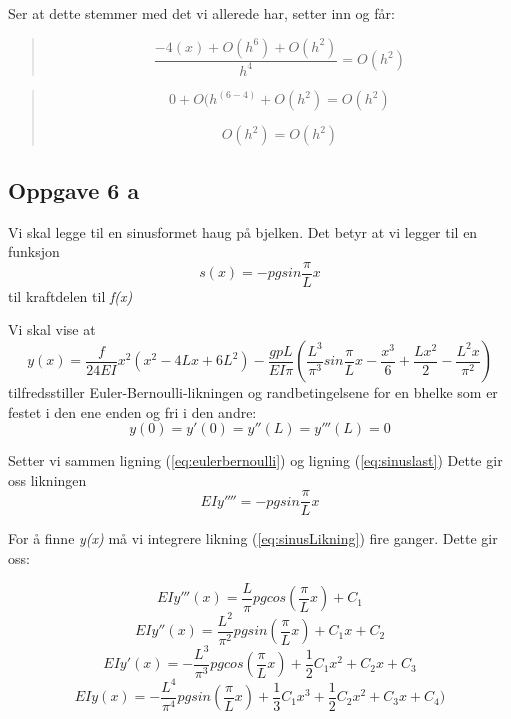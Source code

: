 Ser at dette stemmer med det vi allerede har, setter inn og får:

\begin{quote}
\begin{equation}
\frac{-4(x)+O(h^6)+O(h^2)}{h^4}=O(h^2)
\end{equation}
\end{quote}

\begin{quote}
\begin{equation}
0+O(h^{(6-4)}+O(h^2)=O(h^2)
\end{equation}

\begin{equation}
O(h^2)=O(h^2)
\end{equation}
\end{quote}

\subsection{Oppgave 6 a}\label{sec:oppg6}
Vi skal legge til en sinusformet haug på bjelken. Det betyr at vi legger til en funksjon 
\begin{equation} \label{eq:sinuslast}
s(x) = -pgsin\frac{\pi}{L}x
\end{equation}
til kraftdelen til \textit{f(x)}

Vi skal vise at \begin{equation}
y(x) = \frac{f}{24EI}x^{2}(x^2-4Lx+6L^2)-\frac{gpL}{EI\pi}(\frac{L^3}{\pi^3}sin\frac{\pi}{L}x-\frac{x^3}{6}+\frac{Lx^2}{2}-\frac{L^2x}{\pi^2})
\end{equation}
tilfredsstiller Euler-Bernoulli-likningen og randbetingelsene for en bhelke som er festet i den ene enden og fri i den andre: \begin{equation} \label{eq:randbetingelserBjelke}
y(0)=y'(0)=y''(L)=y'''(L)=0
\end{equation}

Setter vi sammen ligning (\ref{eq:eulerbernoulli}) og ligning (\ref{eq:sinuslast}) 
Dette gir oss likningen 
\begin{equation} \label{eq:sinusLikning}
EIy''''=-pgsin\frac{\pi}{L}x
\end{equation}

For å finne \textit{y(x)} må vi integrere likning (\ref{eq:sinusLikning}) fire ganger. Dette gir oss:

\begin{equation}
EIy'''(x)=\frac{L}{\pi}pgcos(\frac{\pi}{L}x)+C_1
\end{equation}
\begin{equation}
EIy''(x)=\frac{L^2}{\pi^2}pgsin(\frac{\pi}{L}x)+C_1x+C_2
\end{equation}
\begin{equation}
EIy'(x)=-\frac{L^3}{\pi^3}pgcos(\frac{\pi}{L}x)+\frac{1}{2}C_1x^2+C_2x+C_3
\end{equation}
\begin{equation}
EIy(x)=-\frac{L^4}{\pi^4}pgsin(\frac{\pi}{L}x)+\frac{1}{3}C_1x^3+\frac{1}{2}C_2x^2+C_3x+C_4)
\end{equation}

